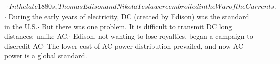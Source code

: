 \documentclass[preview]{standalone}
\begin{document}
\centering $\begin{aligned} \cdot In the late 1880s, Thomas Edison and Nikola Tesla were embroiled in the War of the Currents.\end{aligned}$ \newline $\cdot$ During the early years of electricity, DC (created by Edison) was the standard in the U.S.\newline $\cdot$ But there was one problem. It is difficult to transmit DC long distances; unlike AC.\newline $\cdot$ Edison, not wanting to lose royalties, began a campaign to discredit AC\newline $\cdot$ The lower cost of AC power distribution prevailed, and now AC power is a global standard.
\end{document}
